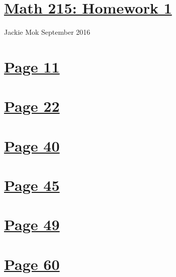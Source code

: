 \documentclass{article}
\begin{document}
\section*{\underline{Math 215: Homework 1}}
Jackie Mok
 September 2016

\section*{\underline{Page 11}}


\section*{\underline{Page 22}}


\section*{\underline{Page 40}}


\section*{\underline{Page 45}}


\section*{\underline{Page 49}}

\section*{\underline{Page 60}}


\end{document}
